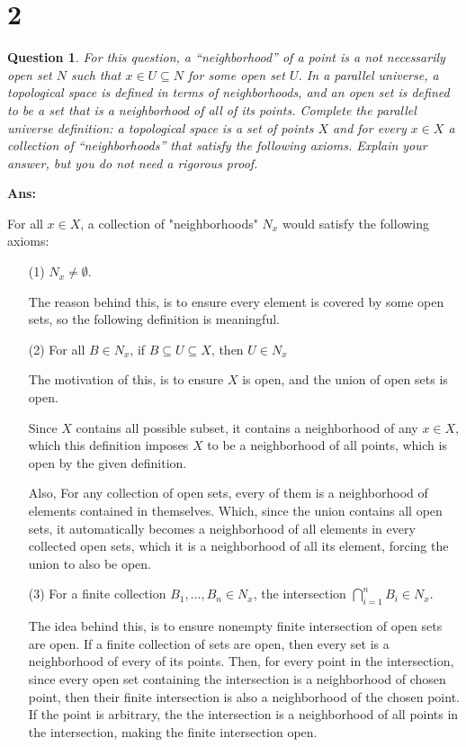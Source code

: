 \documentclass{article}
\newtheorem{question}{Question}
\begin{document}
\section*{2}
\begin{question}
    For this question, a “neighborhood” of a point is a not necessarily open
    set $ N$ such that $x\in U\subseteq N$ for some open set $U$. In a parallel universe, a
    topological space is defined in terms of neighborhoods, and an open set is defined
    to be a set that is a neighborhood of all of its points. Complete the parallel
    universe definition: a topological space is a set of points $X$ and for every $x\in X$
    a collection of “neighborhoods” that satisfy the following axioms. Explain your
    answer, but you do not need a rigorous proof.
\end{question}

\textbf{Ans:}

For all $x\in X$, a collection of "neighborhoods" $N_x$ would satisfy the following axioms:
\begin{itemize}
    \item[(1)]$N_x\neq \emptyset$.
    
    The reason behind this, is to ensure every element is covered by some open sets, so the following definition is meaningful.

    \hfill

    \item[(2)] For all $B\in N_x$, if $B\subseteq U\subseteq X$, then $U\in N_x$
    
    The motivation of this, is to ensure $X$ is open, and the union of open sets is open.

    Since $X$ contains all possible subset, it contains a neighborhood of any $x\in X$, which this definition
    imposes $X$ to be a neighborhood of all points, which is open by the given definition.

    Also, For any collection of open sets, every of them is a neighborhood of elements contained in themselves.
    Which, since the union contains all open sets, it automatically becomes a neighborhood of all elements in every
    collected open sets, which it is a neighborhood of all its element, forcing the union to also be open.

    \hfill

    \item[(3)] For a finite collection $B_1,...,B_n\in N_x$, the intersection $\bigcap_{i=1}^{n}B_i \in N_x$.
    
    The idea behind this, is to ensure nonempty finite intersection of open sets are open.
    If a finite collection of sets are open, then every set is a neighborhood of every of its points.
    Then, for every point in the intersection, since every open set containing the intersection is a neighborhood of chosen point,
    then their finite intersection is also a neighborhood of the chosen point. If the point is arbitrary, the the intersection is a 
    neighborhood of all points in the intersection, making the finite intersection open.
\end{itemize}
\end{document}
